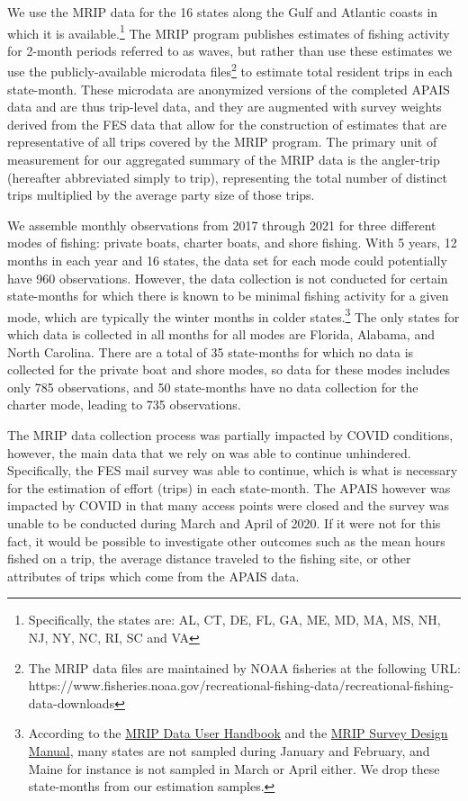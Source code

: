\documentclass[12pt]{article}
\begin{document}
We use the MRIP data for the 16 states along the Gulf and Atlantic
coasts in which it is available.\footnote{Specifically, the states are:
  AL, CT, DE, FL, GA, ME, MD, MA, MS, NH, NJ, NY, NC, RI, SC and VA} The
MRIP program publishes estimates of fishing activity for 2-month periods
referred to as waves, but rather than use these estimates we use the
publicly-available microdata files\footnote{The MRIP data files are
  maintained by NOAA fisheries at the following URL:
  https://www.fisheries.noaa.gov/recreational-fishing-data/recreational-fishing-data-downloads}
to estimate total resident trips in each state-month. These microdata are
anonymized versions of the completed APAIS data and are thus trip-level
data, and they are augmented with survey weights derived from the FES
data that allow for the construction of estimates that are
representative of all trips covered by the MRIP program. The primary
unit of measurement for our aggregated summary of the MRIP data is the
angler-trip (hereafter abbreviated simply to trip), representing the
total number of distinct trips multiplied by the average party size of
those trips.
 
We assemble monthly observations from 2017 through 2021 for three
different modes of fishing: private boats, charter boats, and shore
fishing. With 5 years, 12 months in each year and 16 states, the data
set for each mode could potentially have 960 observations. However, the
data collection is not conducted for certain state-months for which
there is known to be minimal fishing activity for a given mode, which
are typically the winter months in colder states.\footnote{According to the
  \href{https://media.fisheries.noaa.gov/2021-09/MRIP\%20Data\%20User\%20Handbook\%20Updated\%202021-09-30.pdf}{MRIP
  Data User Handbook} and the \href{https://media.fisheries.noaa.gov/2021-09/MRIP-Survey-Design-and-Statistical-Methods-2021-09-15.pdf}{MRIP
  Survey Design Manual}, many states are not sampled during January and February, and Maine for instance is not
  sampled in March or April either.  We drop these state-months from our
  estimation samples.} The only states for which data is collected in
all months for all modes are Florida, Alabama, and North Carolina. There
are a total of 35 state-months for which no data is collected for the
private boat and shore modes, so data for these modes includes only 785
observations, and 50 state-months have no data collection for the
charter mode, leading to 735 observations.

The MRIP data collection process was partially impacted by COVID
conditions, however, the main data that we rely on was able to continue
unhindered. Specifically, the FES mail survey was able to continue,
which is what is necessary for the estimation of effort (trips) in each
state-month. The APAIS however was impacted by COVID in that many access
points were closed and the survey was unable to be conducted during
March and April of 2020. If it were not for this fact, it would be
possible to investigate other outcomes such as the mean hours fished on
a trip, the average distance traveled to the fishing site, or other
attributes of trips which come from the APAIS data.
\end{document}
